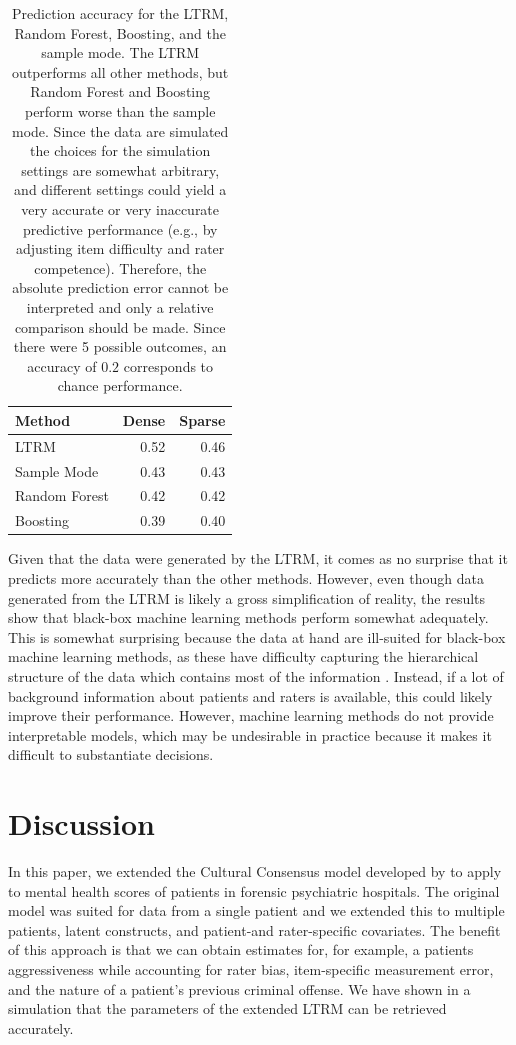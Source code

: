 \documentclass[a4paper,usenames,dvipsnames]{article}
\begin{document}
\begin{table}[!ht]
	\centering
	\caption{Prediction accuracy for the LTRM, Random Forest, Boosting, and the sample mode. The LTRM outperforms all other methods, but Random Forest and Boosting perform worse than the sample mode. Since the data are simulated the choices for the simulation settings are somewhat arbitrary, and different settings could yield a very accurate or very inaccurate predictive performance (e.g., by adjusting item difficulty and rater competence). Therefore, the absolute prediction error cannot be interpreted and only a relative comparison should be made. Since there were 5 possible outcomes, an accuracy of $0.2$ corresponds to chance performance.}
	\begin{tabular}{lrr}
		\toprule
		Method        & Dense & Sparse \\
		\midrule
		LTRM          & 0.52  & 0.46 \\
		Sample Mode   & 0.43  & 0.43 \\
		Random Forest & 0.42  & 0.42 \\
		Boosting      & 0.39  & 0.40 \\
		\bottomrule
	\end{tabular}
\end{table}
Given that the data were generated by the LTRM, it comes as no surprise that it predicts more accurately than the other methods. However, even though data generated from the LTRM is likely a gross simplification of reality, the results show that black-box machine learning methods perform somewhat adequately. This is somewhat surprising because the data at hand are ill-suited for black-box machine learning methods, as these have difficulty capturing the hierarchical structure of the data which contains most of the information \cite<but see>{hajjem2014mixed}. Instead, if a lot of background information about patients and raters is available, this could likely improve their performance. However, machine learning methods do not provide interpretable models, which may be undesirable in practice because it makes it difficult to substantiate decisions. 
 
\section*{Discussion}

In this paper, we extended the Cultural Consensus model developed by  to apply to mental health scores of patients in forensic psychiatric hospitals. The original model was suited for data from a single patient and we extended this to multiple patients, latent constructs, and patient-and rater-specific covariates. The benefit of this approach is that we can obtain estimates for, for example, a patients aggressiveness while accounting for rater bias, item-specific measurement error, and the nature of a patient's previous criminal offense. We have shown in a simulation that the parameters of the extended LTRM can be retrieved accurately.
\end{document}
